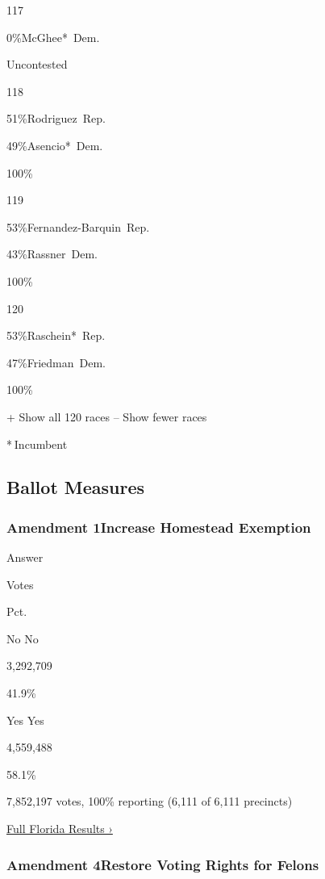 117

 0\%McGhee*~Dem.

Uncontested

118

 51\%Rodriguez~Rep.

 49\%Asencio*~Dem.

100\%

119

 53\%Fernandez-Barquin~Rep.

 43\%Rassner~Dem.

100\%

120

 53\%Raschein*~Rep.

 47\%Friedman~Dem.

100\%

+ Show all 120 races -- Show fewer races

* Incumbent~

\hypertarget{ballot-measures}{%
\subsection{Ballot Measures}\label{ballot-measures}}

\hypertarget{amendment-1increase-homestead-exemption}{%
\subsubsection{Amendment 1Increase Homestead
Exemption}\label{amendment-1increase-homestead-exemption}}

Answer

Votes

Pct.

 No No

3,292,709

41.9\%

 Yes Yes

4,559,488

58.1\%

7,852,197 votes, 100\% reporting (6,111 of 6,111 precincts)

\href{https://www.nytimes3xbfgragh.onion/interactive/2018/11/06/us/elections/results-florida-elections.html}{Full
Florida Results ›}

\hypertarget{amendment-4restore-voting-rights-for-felons}{%
\subsubsection{Amendment 4Restore Voting Rights for
Felons}\label{amendment-4restore-voting-rights-for-felons}}

